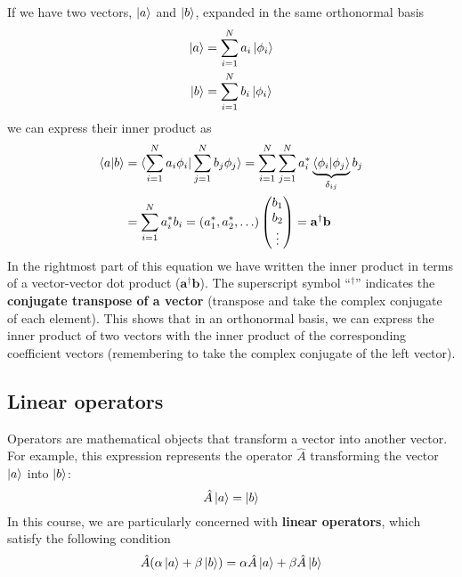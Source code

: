 \documentclass[../Main/chem532-notes.tex]{subfiles}
\begin{document}
If we have two vectors, $\ket{a}$ and $\ket{b}$, expanded in the same orthonormal basis
\begin{equation}
\begin{split}
\ket{a} &= \sum_{i = 1}^N a_i \ket{\phi_i} \\
\ket{b} &= \sum_{i = 1}^N b_i \ket{\phi_i}
\end{split}
\end{equation}
we can express their inner product as
\begin{equation}
\begin{split}
\braket{a|b} &= \braket{\sum_{i = 1}^N a_i \phi_i | \sum_{j = 1}^N b_j \phi_j }
= \sum_{i = 1}^N  \sum_{j = 1}^N a_i^*  \underbrace{\braket{ \phi_i | \phi_j }}_{\delta_{ij}} b_j \\
&= \sum_{i = 1}^N a_i^* b_i = (a^*_1, a^*_2,\ldots)
\begin{pmatrix}
b_1 \\
b_2 \\
\vdots
\end{pmatrix} = 
  \mathbf{a}^\dagger\mathbf{b}
\end{split}
\end{equation}
In the rightmost part of this equation we have written the inner product in terms of a vector-vector dot product ($\mathbf{a}^\dagger \mathbf{b}$). The superscript symbol ``${}^\dagger$'' indicates the \textbf{conjugate transpose of a vector} (transpose and take the complex conjugate of each element). This shows that in an orthonormal basis, we can express the inner product of two vectors with the inner product of the corresponding coefficient vectors (remembering to take the complex conjugate of the left vector). 

\subsection{Linear operators}
Operators are mathematical objects that transform a vector into another vector. For example, this expression represents the operator $\hat{A}$ transforming the vector $\ket{a}$ into $\ket{b}$:
\begin{equation}
\label{eq:bg:operator}
\hat{A} \ket{a} = \ket{b}
\end{equation}
In this course, we are particularly concerned with \textbf{linear operators}, which satisfy the following condition
\begin{equation}
\hat{A} (\alpha \ket{a} + \beta \ket{b}) = \alpha \hat{A} \ket{a} + \beta \hat{A} \ket{b}
\end{equation}
\end{document}
